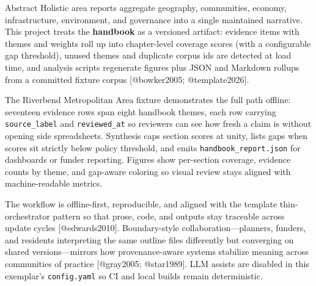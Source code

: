 \documentclass[
  ignorenonframetext,
]{beamer}
\author{\texorpdfstring{}{}}
\date{}
\begin{document}
\begin{frame}[fragile]{Abstract}
\protect{}\label{abstract}
Holistic area reports aggregate geography, communities, economy,
infrastructure, environment, and governance into a single maintained
narrative. This project treats the \textbf{handbook} as a versioned
artifact: evidence items with themes and weights roll up into
chapter-level coverage scores (with a configurable gap threshold),
unused themes and duplicate corpus ids are detected at load time, and
analysis scripts regenerate figures plus JSON and Markdown rollups from
a committed fixture corpus {[}@bowker2005; @template2026{]}.

The Riverbend Metropolitan Area fixture demonstrates the full path
offline: seventeen evidence rows span eight handbook themes, each row
carrying \texttt{source\_label} and \texttt{reviewed\_at} so reviewers
can see how fresh a claim is without opening side spreadsheets.
Synthesis caps section scores at unity, lists gaps when scores sit
strictly below policy threshold, and emits
\texttt{handbook\_report.json} for dashboards or funder reporting.
Figures show per-section coverage, evidence counts by theme, and
gap-aware coloring so visual review stays aligned with machine-readable
metrics.

The workflow is offline-first, reproducible, and aligned with the
template thin-orchestrator pattern so that prose, code, and outputs stay
traceable across update cycles {[}@edwards2010{]}. Boundary-style
collaboration---planners, funders, and residents interpreting the same
outline files differently but converging on shared versions---mirrors
how provenance-aware systems stabilize meaning across communities of
practice {[}@gray2005; @star1989{]}. LLM assists are disabled in this
exemplar's \texttt{config.yaml} so CI and local builds remain
deterministic.
\end{frame}
\end{document}

